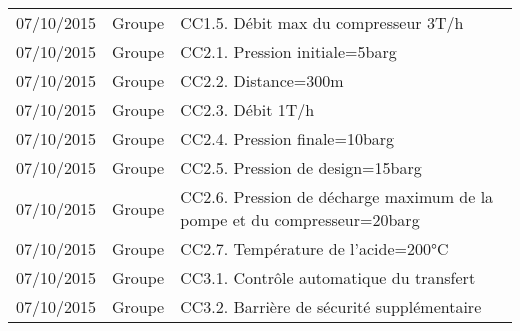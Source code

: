 \documentclass[a4paper]{report}
\begin{document}
\begin{center}
\begin{footnotesize}
\begin{tabular}{|c|c|l|l|}
    07/10/2015 & Groupe & \multicolumn{2}{p{11cm}|}{CC1.5. Débit max du compresseur 3T/h} \\
    07/10/2015 & Groupe & \multicolumn{2}{p{11cm}|}{CC2.1. Pression initiale=5barg } \\
    07/10/2015 & Groupe & \multicolumn{2}{p{11cm}|}{CC2.2. Distance=300m} \\
    07/10/2015 & Groupe & \multicolumn{2}{p{11cm}|}{CC2.3. Débit 1T/h} \\
    07/10/2015 & Groupe & \multicolumn{2}{p{11cm}|}{CC2.4. Pression finale=10barg} \\
    07/10/2015 & Groupe & \multicolumn{2}{p{11cm}|}{CC2.5. Pression de design=15barg} \\
    07/10/2015 & Groupe & \multicolumn{2}{p{11cm}|}{CC2.6. Pression de décharge maximum de la pompe et du compresseur=20barg} \\
    07/10/2015 & Groupe & \multicolumn{2}{p{11cm}|}{CC2.7. Température de l'acide=200°C} \\
    07/10/2015 & Groupe & \multicolumn{2}{p{11cm}|}{CC3.1. Contrôle automatique du transfert} \\
    07/10/2015 & Groupe & \multicolumn{2}{p{11cm}|}{CC3.2. Barrière de sécurité supplémentaire} \\ \hline
\end{tabular}
\end{footnotesize}
\end{center}
\end{document}
